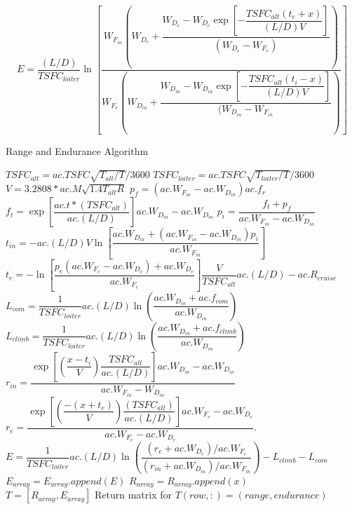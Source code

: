 \begin{equation}
\label{eq:EnduranceWithRange}
    E = \dfrac{(L/D)}{TSFC_{loiter}}\ln\left[\dfrac{W_{F_{in}}\left(W_{D_e}+\dfrac{W_{D_e}-W_{D_e}\exp\left[-\dfrac{TSFC_{alt}(t_e+x)}{(L/D)V}\right]}{(W_{D_e}-W_{F_e})}\right)}{W_{F_e}\left(W_{D_{in}}+\dfrac{W_{D_{in}}-W_{D_{in}}\exp\left[-\dfrac{TSFC_{alt}(t_i-x)}{(L/D)V}\right]}{(W_{D_{in}}-W_{F_{in}}}\right)}\right]
\end{equation}
\begin{algorithm}
\caption{Range and Endurance Algorithm}
\label{Alg:R&E}
\begin{algorithmic}
\State $TSFC_{alt} = ac.TSFC\sqrt{T_{alt}/T}/3600$
\State $TSFC_{loiter} = ac.TSFC\sqrt{T_{loiter}/T}/3600$
\State $V = 3.2808*ac.M\sqrt{1.4T_{alt}R}$
\State $p_f = (ac.W_{F_{in}}-ac.W_{D_{in}})ac.f_r$
\State $f_t = \exp\left[\dfrac{ac.t*(TSFC_{alt})}{ac.(L/D)}\right]ac.W_{D_{in}}-ac.W_{D_{in}}$
\State $p_i = \dfrac{f_t + p_f}{ac.W_{F_{in}}-ac.W_{D_{in}}}$
\State $t_{in} = -ac.(L/D)V\ln\left[\dfrac{ac.W_{D_{in}}+(ac.W_{F_{in}}-ac.W_{D_{in}})p_i}{ac.W_{F_{in}}}\right]$
\State $t_e = -\ln\left[\dfrac{p_e(ac.W_{F_e}-ac.W_{D_e})+ac.W_{D_e}}{ac.W_{F_e}}\right]\dfrac{V}{TSFC_{alt}}ac.(L/D)-ac.R_{cruise}$
\State $L_{com} = \dfrac{1}{TSFC_{loiter}}ac.(L/D)\ln\left(\dfrac{ac.W_{D_{in}}+ac.f_{com}}{ac.W_{D_{in}}}\right)$
\State $L_{climb} = \dfrac{1}{TSFC_{loiter}}ac.(L/D)\ln\left(\dfrac{ac.W_{D_{in}}+ac.f_{climb}}{ac.W_{D_{in}}}\right)$
    \State $r_{in}=\dfrac{\exp\left[\left(\dfrac{x-t_i}{V}\right)\dfrac{TSFC_{alt}}{ac.(L/D)}\right]ac.W_{D_{in}}-ac.W_{D_{in}}}{ac.W_{F_{in}} - W_{D_{in}}}$
    \State $r_e = \dfrac{\exp\left[\left(\dfrac{-(x+t_e)}{V}\right)\dfrac{(TSFC_{alt})}{ac.(L/D)}\right]ac.W_{F_e}-ac.W_{D_e}}{ac.W_{F_e} - ac.W_{D_e}}.$
    \State $E = \dfrac{1}{TSFC_{loiter}}ac.(L/D)\ln\left(\dfrac{(r_e+ ac.W_{D_e})/ac.W_{F_e}}{(r_{in}+ac.W_{D_{in}})/ac.W_{F_{in}}}\right) - L_{climb}-L_{com}$
    \State $E_{array} = E_{array}.append(E)$
    \State $R_{array} = R_{array}.append(x)$
\EndFor\\
\Return $T = [R_{array}, E_{array}]$ \Comment Return matrix for $T(row,:) = (range,endurance)$
\end{algorithmic}
\end{algorithm}
